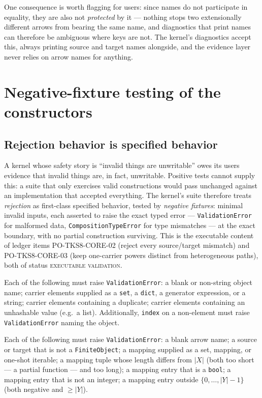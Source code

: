 One consequence is worth flagging for users: since names do not
participate in equality, they are also not \emph{protected} by it ---
nothing stops two extensionally different arrows from bearing the same
name, and diagnostics that print names can therefore be ambiguous where
keys are not. The kernel's diagnostics accept this, always printing
source and target names alongside, and the evidence layer never relies on
arrow names for anything.

\section{Negative-fixture testing of the constructors}\label{ch03:sec:negative-fixtures}

\subsection{Rejection behavior is specified behavior}

A kernel whose safety story is ``invalid things are unwritable'' owes its
users evidence that invalid things are, in fact, unwritable. Positive
tests cannot supply this: a suite that only exercises valid constructions
would pass unchanged against an implementation that accepted everything.
The kernel's suite therefore treats \emph{rejection} as first-class
specified behavior, tested by \emph{negative fixtures}: minimal invalid
inputs, each asserted to raise the exact typed error ---
\texttt{ValidationError} for malformed data,
\texttt{CompositionTypeError} for type mismatches --- at the exact
boundary, with no partial construction surviving. This is the executable
content of ledger items PO-TKS8-CORE-02 (reject every source/target
mismatch) and PO-TKS8-CORE-03 (keep one-carrier powers distinct from
heterogeneous paths), both of status \textsc{executable validation}.

\begin{checkclass}\label{ch03:check:objects}
Each of the following must raise \texttt{ValidationError}:
a blank or non-string object name; carrier elements supplied as a
\texttt{set}, a \texttt{dict}, a generator expression, or a string;
carrier elements containing a duplicate; carrier elements containing an
unhashable value (e.g.\ a list). Additionally, \texttt{index} on a
non-element must raise \texttt{ValidationError} naming the object.
\end{checkclass}

\begin{checkclass}\label{ch03:check:arrows}
Each of the following must raise \texttt{ValidationError}:
a blank arrow name; a source or target that is not a
\texttt{FiniteObject}; a mapping supplied as a set, mapping, or one-shot
iterable; a mapping tuple whose length differs from $|X|$ (both too short
--- a partial function --- and too long); a mapping entry that is a
\texttt{bool}; a mapping entry that is not an integer; a mapping entry
outside $\{0, \dots, |Y|-1\}$ (both negative and $\geq |Y|$).
\end{checkclass}

